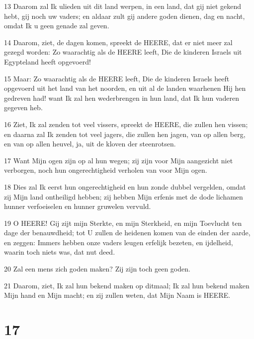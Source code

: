 \par 13 Daarom zal Ik ulieden uit dit land werpen, in een land, dat gij niet gekend hebt, gij noch uw vaders; en aldaar zult gij andere goden dienen, dag en nacht, omdat Ik u geen genade zal geven.
\par 14 Daarom, ziet, de dagen komen, spreekt de HEERE, dat er niet meer zal gezegd worden: Zo waarachtig als de HEERE leeft, Die de kinderen Israels uit Egypteland heeft opgevoerd!
\par 15 Maar: Zo waarachtig als de HEERE leeft, Die de kinderen Israels heeft opgevoerd uit het land van het noorden, en uit al de landen waarhenen Hij hen gedreven had! want Ik zal hen wederbrengen in hun land, dat Ik hun vaderen gegeven heb.
\par 16 Ziet, Ik zal zenden tot veel vissers, spreekt de HEERE, die zullen hen vissen; en daarna zal Ik zenden tot veel jagers, die zullen hen jagen, van op allen berg, en van op allen heuvel, ja, uit de kloven der steenrotsen.
\par 17 Want Mijn ogen zijn op al hun wegen; zij zijn voor Mijn aangezicht niet verborgen, noch hun ongerechtigheid verholen van voor Mijn ogen.
\par 18 Dies zal Ik eerst hun ongerechtigheid en hun zonde dubbel vergelden, omdat zij Mijn land ontheiligd hebben; zij hebben Mijn erfenis met de dode lichamen hunner verfoeiselen en hunner gruwelen vervuld.
\par 19 O HEERE! Gij zijt mijn Sterkte, en mijn Sterkheid, en mijn Toevlucht ten dage der benauwdheid; tot U zullen de heidenen komen van de einden der aarde, en zeggen: Immers hebben onze vaders leugen erfelijk bezeten, en ijdelheid, waarin toch niets was, dat nut deed.
\par 20 Zal een mens zich goden maken? Zij zijn toch geen goden.
\par 21 Daarom, ziet, Ik zal hun bekend maken op ditmaal; Ik zal hun bekend maken Mijn hand en Mijn macht; en zij zullen weten, dat Mijn Naam is HEERE.

\chapter{17}

